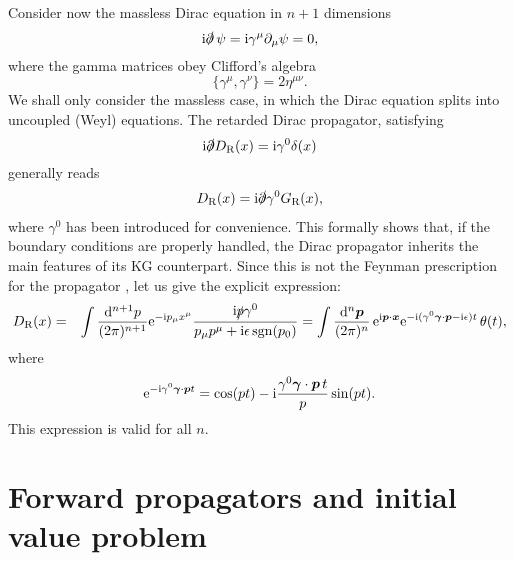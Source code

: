 Consider now the massless Dirac equation in $n+1$ dimensions
\begin{equation}
\label{Dmassless}
\mathrm{i} \slashed{\partial} \, \psi = \mathrm{i} \gamma^\mu \partial_\mu \psi = 0 ,
\end{equation}
where the gamma matrices obey Clifford's algebra 
\begin{equation}
\label{clifford}
\{\gamma^\mu, \gamma^\nu  \}= 2\eta^{\mu\nu}.
\end{equation}
We shall only consider the massless case, in which the Dirac equation splits into uncoupled (Weyl) equations. The {retarded Dirac} propagator, satisfying
\begin{equation}\label{Dmasslessprop}
\mathrm{i} \slashed{\partial} D_{\textrm{R}}(x) = \mathrm{i} \gamma^0 \delta (x)
\end{equation}
generally reads \cite{Peskin}
\begin{eqnarray}
\label{dpropform}
D_{\textrm{R}} (x) = \mathrm{i} \slashed{\partial} \gamma^0 G_\textrm{R} (x) ,
\end{eqnarray} 
where $\gamma^0$ has been introduced for convenience. This formally shows that, if the boundary conditions are properly handled, the Dirac propagator inherits the main features of its KG counterpart. Since this is not the Feynman prescription for the propagator \cite{Peskin,Feynman}, let us give the explicit expression:
\begin{eqnarray}
D_{\textrm{R}} (x)  & = & \int \frac{\mathrm{d}^{n+1} p}{(2 \pi)^{n+1}} \mathrm{e}^{- \mathrm{i} p_{\mu} x^{\mu} } \frac{\mathrm{i} \slashed{p} \gamma^0}{ p_{\mu}p^{\mu} + \mathrm{i} \epsilon \,\mathrm{sgn}(p_0)} 
= \int  \frac{\mathrm{d}^n \bm p}{(2 \pi)^n} \, 
\mathrm{e}^{\mathrm{i} {\bm p} \cdot {\bm x}} \mathrm{e}^{-\mathrm{i}(\gamma^0\bm{\gamma}\cdot\bm{p} -\mathrm{i}\epsilon)t} \, \theta(t) ,
 \label{propDexpl}
\end{eqnarray}
where
\begin{equation}
\mathrm{e}^{-\mathrm{i}\gamma^0\bm{\gamma}\cdot\bm{p} t} = \cos (pt) -\mathrm{i} 
\frac{\gamma^0  \bm{\gamma} \cdot \bm{p}\, t}{p} \sin (pt) .
\end{equation}
This expression is valid for all $n$. 


\section{Forward propagators and initial value problem}
\label{invalue}

